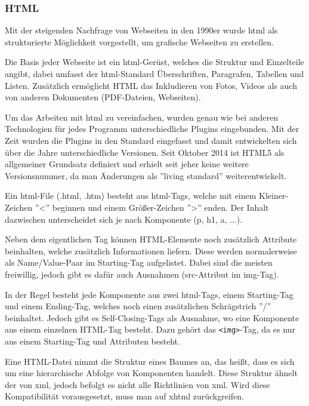 \subsubsection{HTML}

Mit der steigenden Nachfrage von Webseiten in den 1990er wurde \gls{html} als strukturierte Möglichkeit vorgestellt, um grafische Webseiten zu erstellen.

Die Basis jeder Webseite ist ein \gls{html}-Gerüst, welches die Struktur und Einzelteile angibt, dabei umfasst der \gls{html}-Standard Überschriften, Paragrafen, Tabellen und Listen. Zusätzlich ermöglicht HTML das Inkludieren von Fotos, Videos als auch von anderen Dokumenten (PDF-Dateien, Webseiten). \cite{HTML-CSS}

Um das Arbeiten mit \gls{html} zu vereinfachen, wurden genau wie bei anderen Technologien für jedes Programm unterschiedliche Plugins eingebunden. Mit der Zeit wurden die Plugins in den Standard eingefasst und damit entwickelten sich über die Jahre unterschiedliche Versionen. Seit Oktober 2014 ist HTML5 als allgemeiner Grundsatz definiert und erhielt seit jeher keine weitere Versionsnummer, da man Änderungen als ''living standard'' weiterentwickelt. \cite{HTML5}

Ein \gls{html}-File (.html, .htm) besteht aus \gls{html}-Tags, welche mit einem Kleiner-Zeichen ''<'' beginnen und einem Größer-Zeichen ''>'' enden. Der Inhalt dazwischen unterscheidet sich je nach Komponente (p, h1, a, ...).

Neben dem eigentlichen Tag können HTML-Elemente noch zusätzlich Attribute beinhalten, welche zusätzlich Informationen liefern. Diese werden normalerweise als Name/Value-Paar im Starting-Tag aufgelistet. Dabei sind die meisten freiwillig, jedoch gibt es dafür auch Ausnahmen (src-Attribut im img-Tag). \cite{HTML-ATT1, HTML-ATT2}

In der Regel besteht jede Komponente aus zwei \gls{html}-Tags, einem Starting-Tag und einem Ending-Tag, welches noch einen zusätzlichen Schrägstrich ''/'' beinhaltet. Jedoch gibt es Self-Closing-Tags als Ausnahme, wo eine Komponente aus einem einzelnen HTML-Tag besteht. Dazu gehört das \lstinline{<img>}-Tag, da es nur aus einem Starting-Tag und Attributen besteht.

Eine HTML-Datei nimmt die Struktur eines Baumes an, das heißt, dass es sich um eine hierarchische Abfolge von Komponenten handelt. Diese Struktur ähnelt der von \gls{xml}, jedoch befolgt es nicht alle Richtlinien von \gls{xml}. Wird diese Kompatibilität vorausgesetzt, muss man auf \gls{xhtml} zurückgreifen. \cite{HTML-CSS}

